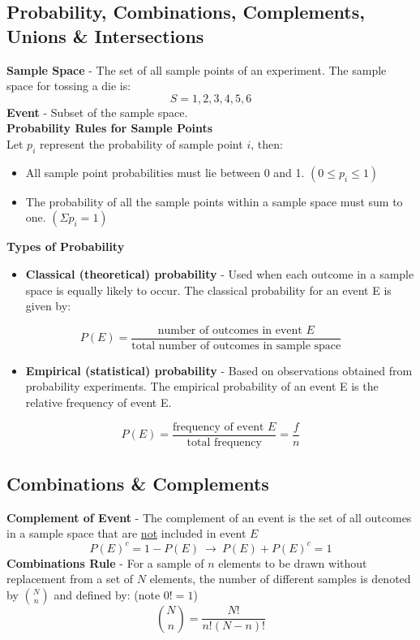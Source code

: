 \documentclass[a4paper]{article}
\let\bf\textbf
\begin{document}
\subsection{Probability, Combinations, Complements, Unions \& Intersections}
\bf{Sample Space} - The set of all sample points of an experiment. The sample space for tossing a die is:
\begin{equation}
    S = {1, 2, 3, 4, 5, 6}
\end{equation}
\bf{Event} - Subset of the sample space.
\vspace{5mm}\\
\bf{Probability Rules for Sample Points}\\
Let $p_i$ represent the probability of sample point $i$, then:
\begin{itemize}
    \item All sample point probabilities must lie between 0 and 1. $(0 \leq p_i \leq 1)$
    \item The probability of all the sample points within a sample space must sum to one. $(\Sigma p_i = 1)$
\end{itemize}
\vspace{5mm}
\bf{Types of Probability}
\begin{itemize}
    \item \bf{Classical (theoretical) probability} - Used when each outcome in a sample space is equally likely to occur. The classical probability for an event E is given by:
\end{itemize}
\begin{equation}
    P(E) = \frac{\text{number of outcomes in event $E$}}{\text{total number of outcomes in sample space}}
\end{equation}
\begin{itemize}
    \item \bf{Empirical (statistical) probability} - Based on observations obtained from probability experiments. The empirical probability of an event E is the relative frequency of event E.
\end{itemize}
\begin{equation}
    P(E) = \frac{\text{frequency of event $E$}}{\text{total frequency}} = \frac{f}{n}
\end{equation}
\newpage
\subsection{Combinations \& Complements}
\bf{Complement of Event} - The complement of an event is the set of all outcomes in a sample space that are \underline{not} included in event $E$
\begin{equation}
    P(E)^c = 1 - P(E) \ \to \ P(E) + P(E)^c = 1
\end{equation} 
\bf{Combinations Rule} - For a sample of $n$ elements to be drawn without replacement from a set of $N$ elements, the number of different samples is denoted by $\binom Nn$ and defined by: \hspace{15mm}(note $0! = 1$)
\begin{equation}
    \binom Nn = \frac{N!}{n!(N-n)!}
\end{equation}
\end{document}

